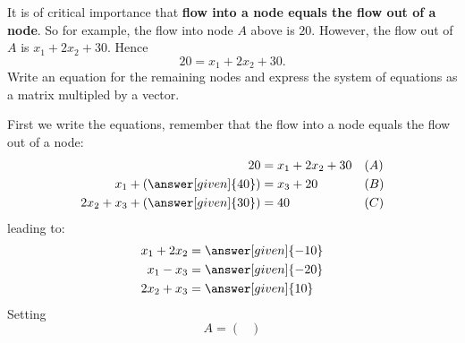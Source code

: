 \documentclass{ximera}
\begin{document}
\begin{example}
\begin{center}
  \end{center}
  It is of critical importance that \textbf{flow into a node equals the
    flow out of a node}. So for example, the flow into node $A$ above is
  $20$. However, the flow out of $A$ is $x_{1} + 2x_{2} + 30$. Hence
  \[
    20  = x_{1} + 2x_{2} + 30.
  \]
  Write an equation for the remaining nodes and express the system of
  equations as a matrix multipled by a vector.
  \begin{explanation}
    First we write the equations, remember that the flow into a node
    equals the flow out of a node:
    \begin{align*}
      20 &= x_{1} + 2x_{2} + 30 & & (A)\\
      x_{1} + \left(\answer[given]{40}\right) &= x_{3} + 20 & & (B) \\
      2x_{2} + x_{3} + \left(\answer[given]{30}\right) &= 40  & & (C)
    \end{align*}
    leading to:
    \begin{align*}
      x_{1}+2x_{2} &= \answer[given]{-10}\\
      x_{1} -x_{3}&= \answer[given]{-20}\\
      2x_{2} + x_{3}  &= \answer[given]{10}
    \end{align*}
    Setting
    \[
      A = \begin{pmatrix}

\end{pmatrix}\]
\end{explanation}
\end{example}
\end{document}
